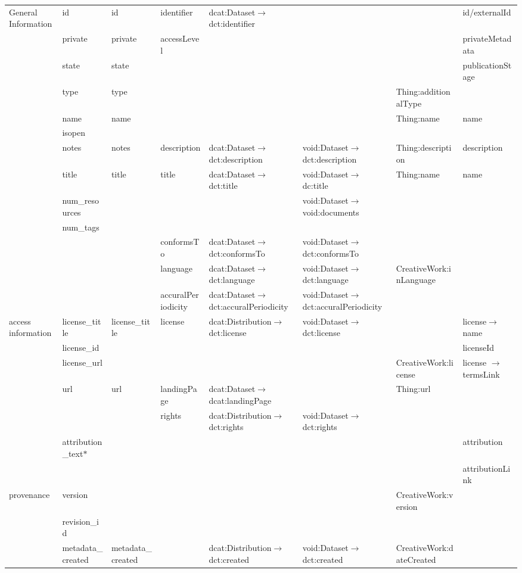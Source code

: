 \documentclass[runningheads,a4paper]{../../Tools/LaTEX/llncs}
\begin{document}
{\begin{landscape}
{\begin{longtable}{|p{1cm}|m{3.1cm}|m{2.4cm}|m{2.5cm}|p{3.8cm}|m{3.8cm}|m{6.5cm}|m{2.5cm}|}
\multirow{13}{2cm}{General Information} & id & id & identifier & dcat:Dataset$\rightarrow$ dct:identifier &  &  & id/externalId\tabularnewline
\cline{2-8}
 & private & private & accessLevel &  &  &  & privateMetadata\tabularnewline
\cline{2-8}
 & state & state &  &  &  &  & publicationStage\tabularnewline
\cline{2-8}
 & type & type &  &  &  & Thing:additionalType & \tabularnewline
\cline{2-8}
 & name & name &  &  &  & Thing:name & name\tabularnewline
\cline{2-8}
 & isopen &  &  &  &  &  & \tabularnewline
\cline{2-8}
 & notes & notes & description & dcat:Dataset$\rightarrow$ dct:description & void:Dataset$\rightarrow$ dct:description & Thing:description & description\tabularnewline
\cline{2-8}
 & title & title & title & dcat:Dataset$\rightarrow$ dct:title & void:Dataset$\rightarrow$ dc:title & Thing:name & name\tabularnewline
\cline{2-8}
 & num\_resources &  &  &  & void:Dataset$\rightarrow$ void:documents &  & \tabularnewline
\cline{2-8}
 & num\_tags &  &  &  &  &  & \tabularnewline
\cline{2-8}
 &  &  & conformsTo & dcat:Dataset$\rightarrow$ dct:conformsTo & void:Dataset$\rightarrow$ dct:conformsTo &  & \tabularnewline
\cline{2-8}
 &  &  & language & dcat:Dataset$\rightarrow$ dct:language & void:Dataset$\rightarrow$ dct:language & CreativeWork:inLanguage & \tabularnewline
\cline{2-8}
 &  &  & accuralPeriodicity & dcat:Dataset$\rightarrow$ dct:accuralPeriodicity & void:Dataset$\rightarrow$ dct:accuralPeriodicity &  & \tabularnewline
\hline
\multirow{7}{2cm}{access information} & license\_title & license\_title & license & dcat:Distribution$\rightarrow$ dct:license & void:Dataset$\rightarrow$ dct:license &  & license$\rightarrow$  name\tabularnewline
\cline{2-8}
 & license\_id &  &  &  &  &  & licenseId\tabularnewline
\cline{2-8}
 & license\_url &  &  &  &  & CreativeWork:license & license $\rightarrow$  termsLink\tabularnewline
\cline{2-8}
 & url & url & landingPage & dcat:Dataset$\rightarrow$ dcat:landingPage &  & Thing:url & \tabularnewline
\cline{2-8}
 &  &  & rights & dcat:Distribution$\rightarrow$  dct:rights & void:Dataset$\rightarrow$ dct:rights &  & \tabularnewline
\cline{2-8}
 & attribution\_text$\ast$ &  &  &  &  &  & attribution\tabularnewline
\cline{2-8}
 &  &  &  &  &  &  & attributionLink\tabularnewline
\hline
\multirow{7}{2cm}{provenance} & version &  &  &  &  & CreativeWork:version & \tabularnewline
\cline{2-8}
 & revision\_id &  &  &  &  &  & \tabularnewline
\cline{2-8}
 & metadata\_created & metadata\_created &  & dcat:Distribution$\rightarrow$ dct:created & void:Dataset$\rightarrow$ dct:created & CreativeWork:dateCreated & \tabularnewline

\end{longtable}}
\end{landscape}}
\end{document}

